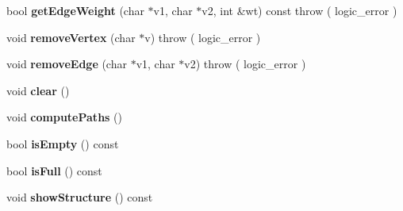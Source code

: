 \begin{DoxyCompactItemize}
\item 
bool {\bfseries get\+Edge\+Weight} (char $\ast$v1, char $\ast$v2, int \&wt) const   throw ( logic\+\_\+error )\hypertarget{class_weighted_graph_a0ff5197e169472040ab88b81049340d9}{}\label{class_weighted_graph_a0ff5197e169472040ab88b81049340d9}

\item 
void {\bfseries remove\+Vertex} (char $\ast$v)  throw ( logic\+\_\+error )\hypertarget{class_weighted_graph_a0eb59d893befdedcda67add1466b9fdd}{}\label{class_weighted_graph_a0eb59d893befdedcda67add1466b9fdd}

\item 
void {\bfseries remove\+Edge} (char $\ast$v1, char $\ast$v2)  throw ( logic\+\_\+error )\hypertarget{class_weighted_graph_ad06596ac31405f02f39e482860ebe3a8}{}\label{class_weighted_graph_ad06596ac31405f02f39e482860ebe3a8}

\item 
void {\bfseries clear} ()\hypertarget{class_weighted_graph_a26890ebf74d23821a6e4dbcf803b5002}{}\label{class_weighted_graph_a26890ebf74d23821a6e4dbcf803b5002}

\item 
void {\bfseries compute\+Paths} ()\hypertarget{class_weighted_graph_aeaea1bd5b1e14b69f2155613bfd25d68}{}\label{class_weighted_graph_aeaea1bd5b1e14b69f2155613bfd25d68}

\item 
bool {\bfseries is\+Empty} () const \hypertarget{class_weighted_graph_a1c03a0f68447cf88fed97c2076501702}{}\label{class_weighted_graph_a1c03a0f68447cf88fed97c2076501702}

\item 
bool {\bfseries is\+Full} () const \hypertarget{class_weighted_graph_a22e56836e3967031a657cfa9ea5b9843}{}\label{class_weighted_graph_a22e56836e3967031a657cfa9ea5b9843}

\item 
void {\bfseries show\+Structure} () const \hypertarget{class_weighted_graph_ad7f20a989073ea5401d504d944182347}{}\label{class_weighted_graph_ad7f20a989073ea5401d504d944182347}

\end{DoxyCompactItemize}
